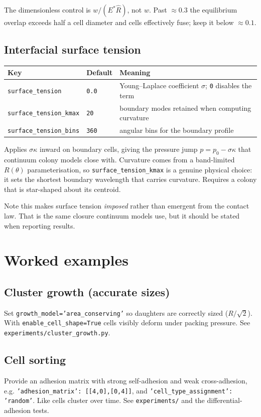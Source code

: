 \documentclass[11pt]{article}
\newcommand{\code}[1]{\texttt{#1}}
\begin{document}
The dimensionless control is $w/(E^\ast \hat R)$, not $w$. Past $\approx 0.3$ the
equilibrium overlap exceeds half a cell diameter and cells effectively fuse; keep
it below $\approx 0.1$.

\subsection{Interfacial surface tension}
\begin{longtable}{p{} p{} p{}}
\toprule
Key & Default & Meaning \\ \midrule \endhead
\code{surface\_tension} & \code{0.0} & Young--Laplace coefficient $\sigma$;
  \code{0} disables the term \\
\code{surface\_tension\_kmax} & \code{20} & boundary modes retained when
  computing curvature \\
\code{surface\_tension\_bins} & \code{360} & angular bins for the boundary
  profile \\
\bottomrule
\end{longtable}
Applies $\sigma\kappa$ inward on boundary cells, giving the pressure jump
$p=p_0-\sigma\kappa$ that continuum colony models close with. Curvature comes
from a band-limited $R(\theta)$ parameterisation, so \code{surface\_tension\_kmax}
is a genuine physical choice: it sets the shortest boundary wavelength that
carries curvature. Requires a colony that is star-shaped about its centroid.

Note this makes surface tension \emph{imposed} rather than emergent from the
contact law. That is the same closure continuum models use, but it should be
stated when reporting results.

\section{Worked examples}

\subsection{Cluster growth (accurate sizes)}
Set \code{growth\_model='area\_conserving'} so daughters are correctly sized
($R/\sqrt2$). With \code{enable\_cell\_shape=True} cells visibly deform under
packing pressure. See \code{experiments/cluster\_growth.py}.

\subsection{Cell sorting}
Provide an adhesion matrix with strong self-adhesion and weak cross-adhesion,
e.g. \code{'adhesion\_matrix': [[4,0],[0,4]]}, and
\code{'cell\_type\_assignment': 'random'}. Like cells cluster over time. See
\code{experiments/} and the differential-adhesion tests.
\end{document}
